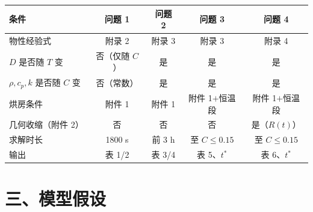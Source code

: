\documentclass[12pt,a4paper]{ctexart}
\begin{document}
\begin{center}
{\begin{tabular}{lcccc}
\toprule
条件 & 问题 1 & 问题 2 & 问题 3 & 问题 4 \\
\midrule
物性经验式 & 附录 2 & 附录 3 & 附录 3 & 附录 4 \\
$D$ 是否随 $T$ 变 & 否（仅随 $C$） & 是 & 是 & 是 \\
$\rho,c_p,k$ 是否随 $C$ 变 & 否（常数） & 是 & 是 & 是 \\
烘房条件 & 附件 1 & 附件 1 & 附件 1$+$恒温段 & 附件 1$+$恒温段 \\
几何收缩（附件 2） & 否 & 否 & 否 & 是（$R(t)$） \\
求解时长 & 1800 s & 前 3 h & 至 $C\le0.15$ & 至 $C\le0.15$ \\
输出 & 表 1/2 & 表 3/4 & 表 5、$t^*$ & 表 6、$t^*$ \\
\bottomrule
\end{tabular}}
\end{center}
\section{三、模型假设}
\end{document}

